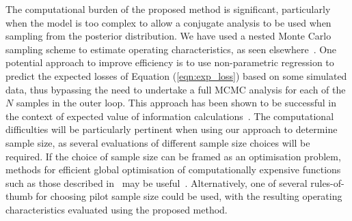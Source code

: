 \documentclass[AMA,STIX1COL]{WileyNJD-v2}
\begin{document}
The computational burden of the proposed method is significant, particularly when the model is too complex to allow a conjugate analysis to be used when sampling from the posterior distribution. We have used a nested Monte Carlo sampling scheme to estimate operating characteristics, as seen elsewhere~\cite{Wang2002, OHagan2005, Sutton2007}. One potential approach to improve efficiency is to use non-parametric regression to predict the expected losses of Equation (\ref{eqn:exp_loss}) based on some simulated data, thus bypassing the need to undertake a full MCMC analysis for each of the $N$ samples in the outer loop. This approach has been shown to be successful in the context of expected value of information calculations~\cite{Strong2014, Strong2015}. The computational difficulties will be particularly pertinent when using our approach to determine sample size, as several evaluations of different sample size choices will be required. If the choice of sample size can be framed as an optimisation problem, methods for efficient global optimisation of computationally expensive functions such as those described in~\cite{Jones2001, Roustant2012} may be useful~\cite{Wilson2015}. Alternatively, one of several rules-of-thumb for choosing pilot sample size \cite{Lancaster2004, Julious2005, Teare2014, Whitehead2015} could be used, with the resulting operating characteristics evaluated using the proposed method.

\end{document}
